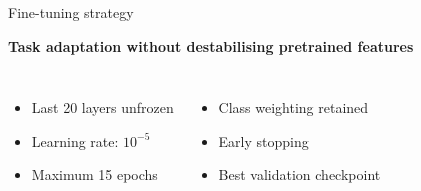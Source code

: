 \documentclass[aspectratio=169,11pt]{beamer}
\newcommand{\stepitem}{\item<+->}
\newcommand{\stepitem}{\item}
\begin{document}


\begin{frame}{Fine-tuning strategy}

\vspace{-0.3em}

\centering

{\normalsize\bfseries
Task adaptation without destabilising pretrained features
}

\vspace{0.55em}

\begin{columns}[T,onlytextwidth]


\begin{itemize}
  \setlength{\itemsep}{0.62em}

  \stepitem Last 20 layers unfrozen
  \stepitem Learning rate: \(10^{-5}\)
  \stepitem Maximum 15 epochs
\end{itemize}


\begin{itemize}
  \setlength{\itemsep}{0.62em}

  \stepitem Class weighting retained
  \stepitem Early stopping
  \stepitem Best validation checkpoint
\end{itemize}

\end{columns}

\end{frame}

\end{document}
